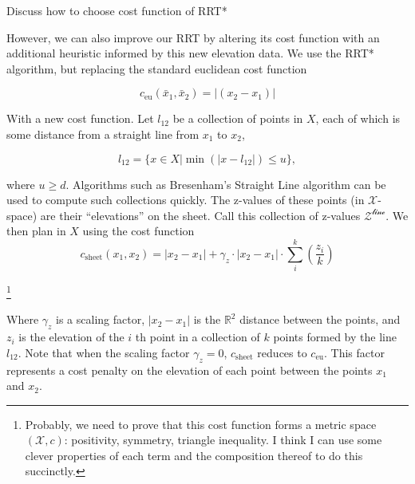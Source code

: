 \documentclass[letterpaper, 12pt]{article}
\newcommand{\dac}[1]{\color{red}#1}
\begin{document}
{\dac Discuss how to choose cost function of RRT*}

However, we can also improve our RRT by altering its cost function with an additional heuristic informed by this new elevation data. We use the RRT* algorithm, but replacing the standard euclidean cost function

\begin{equation}
c_\text{eu}(\bar{x}_1, \bar{x}_2) = |(x_2 - x_1)|
\end{equation}


With a new cost function. Let $l_{12}$ be a collection of points in $X$, each of which is some distance from a straight line from $x_1$ to $x_2$,

\begin{equation}
l_{12} = \{x \in X | \min(|x - l_{12}|) \leq u \},
\end{equation}

where $u \geq d$. Algorithms such as Bresenham's Straight Line algorithm can be used to compute such collections quickly. The z-values of these points (in $\mathcal{X}$-space) are their ``elevations'' on the sheet. Call this collection of z-values $\mathcal{Z^\text{line}}$. We then plan in $X$ using the cost function
\begin{equation}
c_\text{sheet}(x_1, x_2) = |x_2 - x_1| + \gamma_z \cdot |x_2 - x_1| \cdot \sum^k_i({\frac{z_i}{k}})
\end{equation}

\footnote{
Probably, we need to prove that this cost function forms a metric space $(\mathcal{X}, c)$: positivity, symmetry,  triangle inequality. I think I can use some clever properties of each term and the composition thereof to do this succinctly.}

Where $\gamma_z$ is a scaling factor, $|x_2-x_1|$ is the $\mathbb{R}^2$ distance between the points, and $z_i$ is the elevation of the $i$ th point in a collection of $k$ points formed by the line $l_{12}$. Note that when the scaling factor $\gamma_z=0$, $c_\text{sheet}$ reduces to $c_\text{eu}$. This factor represents a cost penalty on the elevation of each point between the points $x_1$ and $x_2$. 
\end{document}
